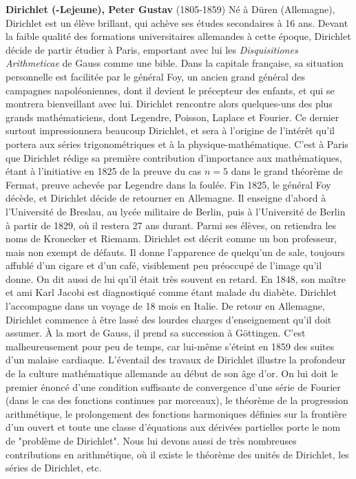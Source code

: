 \textbf{Dirichlet (-Lejeune), Peter Gustav} (1805-1859) Né à Düren (Allemagne), Dirichlet est un élève brillant, qui achève ses études secondaires à 16 ans. Devant la faible qualité des formations universitaires allemandes à cette époque, Dirichlet décide de partir étudier à Paris, emportant avec lui les\textit{ Disquisitiones Arithmeticae} de Gauss comme une bible. Dans la capitale française, sa situation personnelle est facilitée par le général Foy, un ancien grand général des campagnes napoléoniennes, dont il devient le précepteur des enfants, et qui se montrera bienveillant avec lui. Dirichlet rencontre alors quelques-uns des plus grands mathématiciens, dont Legendre, Poisson, Laplace et Fourier. Ce dernier surtout impressionnera beaucoup Dirichlet, et sera à l'origine de l'intérêt qu'il portera aux séries trigonométriques et à la physique-mathématique. C'est à Paris que Dirichlet rédige sa première contribution d'importance aux mathématiques, étant à l'initiative en 1825 de la preuve du cas $n=5$ dans le grand théorème de Fermat, preuve achevée par Legendre dans la foulée. Fin 1825, le général Foy décède, et Dirichlet décide de retourner en Allemagne. Il enseigne d'abord à l'Université de Breslau, au lycée militaire de Berlin, puis à l'Université de Berlin à partir de 1829, où il restera 27 ans durant. Parmi ses élèves, on retiendra les noms de Kronecker et Riemann. Dirichlet est décrit comme un bon professeur, mais non exempt de défauts. Il donne l'apparence de quelqu'un de sale, toujours affublé d'un cigare et d'un café, visiblement peu préoccupé de l'image qu'il donne. On dit aussi de lui qu'il était très souvent en retard. En 1848, son maître et ami Karl Jacobi est diagnostiqué comme étant malade du diabète. Dirichlet l'accompagne dans un voyage de 18 mois en Italie. De retour en Allemagne, Dirichlet commence à être lassé des lourdes charges d'enseignement qu'il doit assumer. À la mort de Gauss, il prend sa succession à Göttingen. C'est malheureusement pour peu de temps, car lui-même s'éteint en 1859 des suites d'un malaise cardiaque. L'éventail des travaux de Dirichlet illustre la profondeur de la culture mathématique allemande au début de son âge d'or. On lui doit le premier énoncé d'une condition suffisante de convergence d'une série de Fourier (dans le cas des fonctions continues par morceaux), le théorème de la progression arithmétique, le prolongement des fonctions harmoniques définies sur la frontière d'un ouvert et toute une classe d'équations aux dérivées partielles porte le nom de "problème de Dirichlet".  Nous lui devons aussi de très nombreuses contributions en arithmétique, où il existe le théorème des unités de Dirichlet, les séries de Dirichlet, etc.

